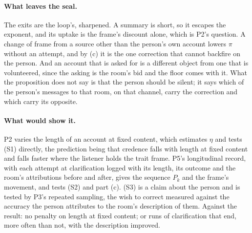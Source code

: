\paragraph{What leaves the seal.} The exits are the loop's, sharpened. A summary is short, so it escapes the exponent, and its uptake is the frame's discount alone, which is P2's question. A change of frame from a source other than the person's own account lowers $\pi$ without an attempt, and by (c) it is the one correction that cannot backfire on the person. And an account that is asked for is a different object from one that is volunteered, since the asking is the room's bid and the floor comes with it. What the proposition does not say is that the person should be silent; it says which of the person's messages to that room, on that channel, carry the correction and which carry its opposite.

\paragraph{What would show it.} P2 varies the length of an account at fixed content, which estimates $\eta$ and tests (S1) directly, the prediction being that credence falls with length at fixed content and falls faster where the listener holds the trait frame. P5's longitudinal record, with each attempt at clarification logged with its length, its outcome and the room's attributions before and after, gives the sequence $P_k$ and the frame's movement, and tests (S2) and part (c). (S3) is a claim about the person and is tested by P3's repeated sampling, the wish to correct measured against the accuracy the person attributes to the room's description of them. Against the result: no penalty on length at fixed content; or runs of clarification that end, more often than not, with the description improved.

